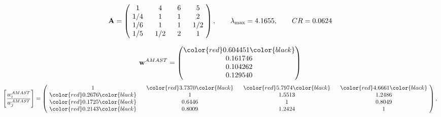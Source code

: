\begin{example}
\begin{equation*}
\mathbf{A} =
\begin{pmatrix}
$\,\,$ 1 $\,\,$ & $\,\,$4$\,\,$ & $\,\,$6$\,\,$ & $\,\,$5 $\,\,$ \\
$\,\,$ 1/4$\,\,$ & $\,\,$ 1 $\,\,$ & $\,\,$1$\,\,$ & $\,\,$2 $\,\,$ \\
$\,\,$ 1/6$\,\,$ & $\,\,$ 1 $\,\,$ & $\,\,$ 1 $\,\,$ & $\,\,$ 1/2 $\,\,$ \\
$\,\,$ 1/5$\,\,$ & $\,\,$ 1/2$\,\,$ & $\,\,$2$\,\,$ & $\,\,$ 1  $\,\,$ \\
\end{pmatrix},
\qquad
\lambda_{\max} =
4.1655,
\qquad
CR = 0.0624
\end{equation*}

\begin{equation*}
\mathbf{w}^{AMAST} =
\begin{pmatrix}
\color{red} 0.604451\color{black} \\
0.161746\\
0.104262\\
0.129540
\end{pmatrix}\end{equation*}
\begin{equation*}
\left[ \frac{{w}^{AMAST}_i}{{w}^{AMAST}_j} \right] =
\begin{pmatrix}
$\,\,$ 1 $\,\,$ & $\,\,$\color{red} 3.7370\color{black} $\,\,$ & $\,\,$\color{red} 5.7974\color{black} $\,\,$ & $\,\,$\color{red} 4.6661\color{black} $\,\,$ \\
$\,\,$\color{red} 0.2676\color{black} $\,\,$ & $\,\,$ 1 $\,\,$ & $\,\,$1.5513$\,\,$ & $\,\,$1.2486  $\,\,$ \\
$\,\,$\color{red} 0.1725\color{black} $\,\,$ & $\,\,$0.6446$\,\,$ & $\,\,$ 1 $\,\,$ & $\,\,$0.8049 $\,\,$ \\
$\,\,$\color{red} 0.2143\color{black} $\,\,$ & $\,\,$0.8009$\,\,$ & $\,\,$1.2424$\,\,$ & $\,\,$ 1  $\,\,$ \\
\end{pmatrix},
\end{equation*}


\end{example}
